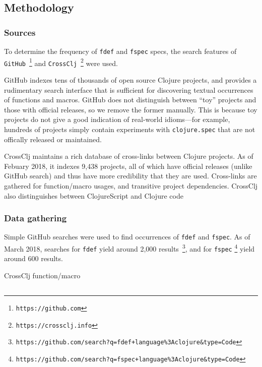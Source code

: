 \subsection{Methodology}

\subsubsection{Sources}

To determine the frequency of \texttt{fdef} and \texttt{fspec} specs,
the search features of \texttt{GitHub}~\footnote{\texttt{https://github.com}} and 
\texttt{CrossClj}~\footnote{\texttt{https://crossclj.info}} were used.

GitHub indexes tens of thousands of open source Clojure projects, and provides
a rudimentary search interface that is sufficient for discovering textual occurrences 
of functions and macros.
GitHub does not distinguish
between ``toy'' projects and those with official releases, so we remove the former manually.
This is because toy projects do not give a good indication of real-world idioms---for example,
hundreds of projects simply contain experiments with \texttt{clojure.spec} that
are not offically released or maintained.

CrossClj maintains a rich database of cross-links between Clojure projects.
As of Febuary 2018, it indexes 9,438 projects, all of which have official releases (unlike
GitHub search) and thus have more credibility that they are used.
Cross-links are gathered for function/macro usages, and transitive project dependencies.
CrossClj also distinguishes between ClojureScript and Clojure code

\subsubsection{Data gathering}

Simple GitHub searches were used to find occurrences of \texttt{fdef} and \texttt{fspec}.
As of March 2018,
searches for \texttt{fdef}
yield around 2,000 results~\footnote{\texttt{https://github.com/search?q=fdef+language\%3Aclojure\&type=Code}},
and for \texttt{fspec} 
\footnote{\texttt{https://github.com/search?q=fspec+language\%3Aclojure\&type=Code}}
yield around 600 results.

CrossClj function/macro 

\subsection{}

